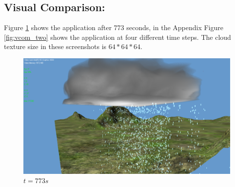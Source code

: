 \subsection{Visual Comparison:}
\label{sec:visual_results}

Figure \ref{fig:vcom} shows the application after 773 seconds, in the Appendix Figure \ref{fig:vcom_two} shows the application at four different time steps. The cloud texture size in these screenshots is $64*64*64$. 

\begin{figure}[ht!]
	\centering
	\includegraphics[width=\textwidth]{images/visualcomparrison.png}
	\caption{$t = 773s$}
	\label{fig:vcom}
\end{figure}